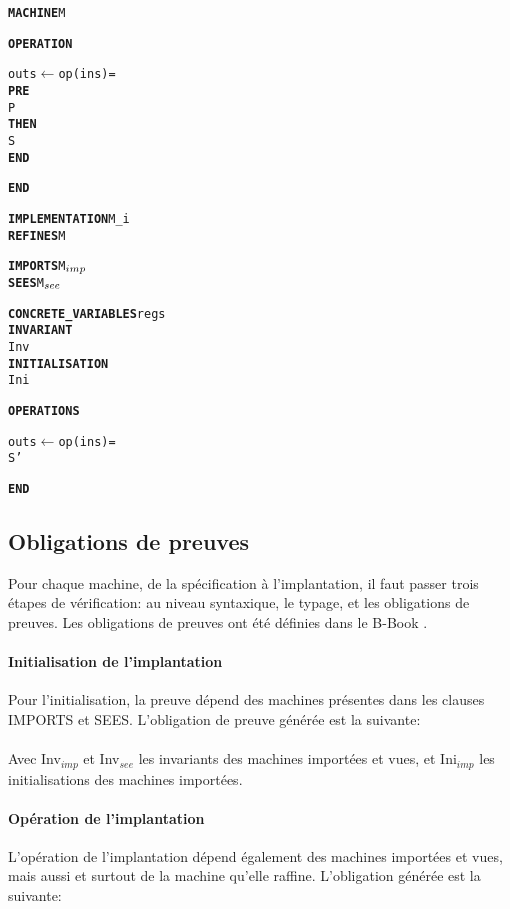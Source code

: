 \setlength{\columnseprule}{0.05cm}
\begin{multicols}{2}
\begin{alltt}
\textbf{MACHINE} M

\textbf{OPERATION}

outs \(\leftarrow\) op(ins) =
  \textbf{PRE}
    P
  \textbf{THEN}
    S
  \textbf{END}

\textbf{END}
\end{alltt}
\columnbreak
\begin{alltt}
\textbf{IMPLEMENTATION} M\_i
\textbf{REFINES} M

\textbf{IMPORTS} M\(\sb{imp}\)
\textbf{SEES} M\(\sb{see}\)

\textbf{CONCRETE\_VARIABLES} regs
\textbf{INVARIANT}
  Inv
\textbf{INITIALISATION}
  Ini

\textbf{OPERATIONS}
  
outs \(\leftarrow\) op(ins) =
  S'

\textbf{END}
\end{alltt}
\end{multicols}



\subsection{Obligations de preuves}

Pour chaque machine, de la spécification à l'implantation, il faut
passer trois étapes de vérification: au niveau syntaxique, le typage, et les obligations de preuves.  
Les obligations de preuves ont été définies dans le B-Book \cite{JRA}. 

\paragraph{Initialisation de l'implantation} Pour l'initialisation, la preuve
dépend des machines présentes dans les clauses IMPORTS et
SEES. L'obligation de preuve générée est la suivante:\\

 \\

Avec Inv$_{imp}$ et  Inv$_{see}$ les invariants des machines importées et vues,
et Ini$_{imp}$ les initialisations des machines importées. \\


\paragraph{Opération de l'implantation}
L'opération de l'implantation dépend également des machines importées et vues, mais
aussi et surtout de la machine qu'elle raffine. L'obligation générée est la
suivante:\\

\\




